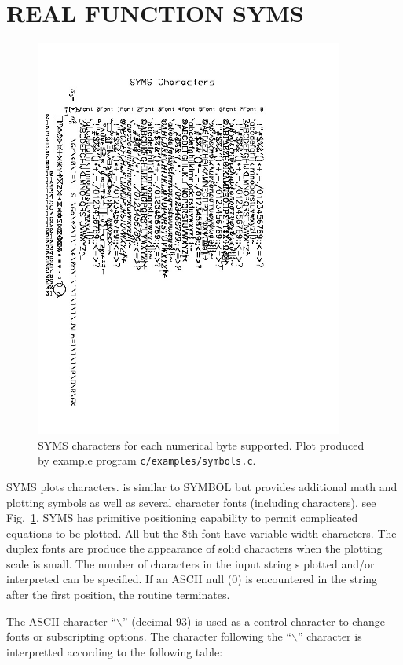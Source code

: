 \documentclass[11pt]{report}
\begin{document}
\section{REAL FUNCTION SYMS}

\begin{figure}[htb]
\centering
\includegraphics[width=4in,angle=90,origin=c]{figures/symbols1.jpg}
\vspace{-.5in}
\caption{SYMS characters for each numerical byte supported. Plot produced by example program
{\tt c/examples/symbols.c}.
\label{fig:syms}} 
\end{figure}

SYMS plots characters.  is similar to SYMBOL but provides
additional math and plotting symbols as well as several character
fonts (including  characters), see Fig.~\ref{fig:syms}. SYMS
has primitive positioning capability to permit complicated equations
to be plotted.  All but the 8th font have variable width characters.
The duplex fonts are produce the appearance of solid characters when
the plotting scale is small.  The number of characters in the input
string s plotted and/or interpreted can be specified.  If an ASCII
null (0) is encountered in the string after the first position, the
routine terminates.

The ASCII character ``$\backslash$'' (decimal 93) is used as a control
character to change fonts or subscripting options.  The character
following the ``$\backslash$'' character is interpretted according to
the following table:
\end{document}

